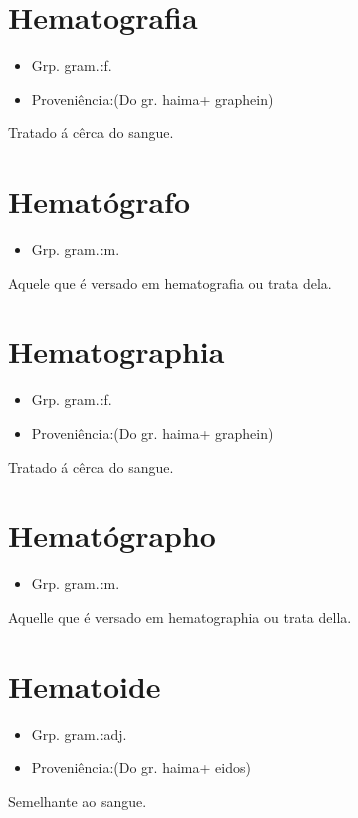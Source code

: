 \documentclass{article}
\begin{document}
\section{Hematografia}
\begin{itemize}
\item {Grp. gram.:f.}
\end{itemize}
\begin{itemize}
\item {Proveniência:(Do gr. \textunderscore haima\textunderscore  + \textunderscore graphein\textunderscore )}
\end{itemize}
Tratado á cêrca do sangue.
\section{Hematógrafo}
\begin{itemize}
\item {Grp. gram.:m.}
\end{itemize}
Aquele que é versado em hematografia ou trata dela.
\section{Hematographia}
\begin{itemize}
\item {Grp. gram.:f.}
\end{itemize}
\begin{itemize}
\item {Proveniência:(Do gr. \textunderscore haima\textunderscore  + \textunderscore graphein\textunderscore )}
\end{itemize}
Tratado á cêrca do sangue.
\section{Hematógrapho}
\begin{itemize}
\item {Grp. gram.:m.}
\end{itemize}
Aquelle que é versado em hematographia ou trata della.
\section{Hematoide}
\begin{itemize}
\item {Grp. gram.:adj.}
\end{itemize}
\begin{itemize}
\item {Proveniência:(Do gr. \textunderscore haima\textunderscore  + \textunderscore eidos\textunderscore )}
\end{itemize}
Semelhante ao sangue.
\end{document}
